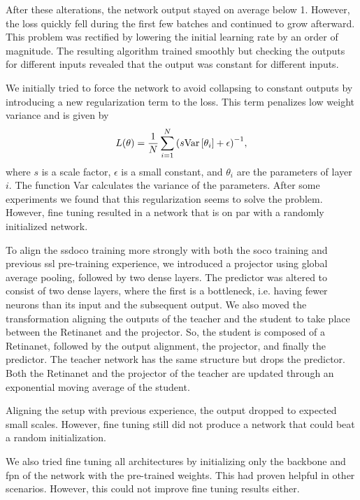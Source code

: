 After these alterations, the network output stayed on average below 1. However, the loss quickly fell during the first few batches and continued to grow afterward. This problem was rectified by lowering the initial learning rate by an order of magnitude. The resulting algorithm trained smoothly but checking the outputs for different inputs revealed that the output was constant for different inputs.

We initially tried to force the network to avoid collapsing to constant outputs by introducing a new regularization term to the loss. This term penalizes low weight variance and is given by
\begin{equation}
L{\left( \theta \right)}=\frac{1}{N}\sum_{i=1}^N{\left( s\text{Var}\left[\theta_i\right]+\epsilon \right)}^{-1},
\end{equation}
where $s$ is a scale factor, $\epsilon$ is a small constant, and $\theta_i$ are the parameters of layer $i$. The function Var calculates the variance of the parameters. After some experiments we found that this regularization seems to solve the problem. However, fine tuning resulted in a network that is on par with a randomly initialized network.

To align the \acrshort{ssdoco} training more strongly with both the \acrshort{soco} training and previous \acrshort{ssl} pre-training experience, we introduced a projector using global average pooling, followed by two dense layers. The predictor was altered to consist of two dense layers, where the first is a bottleneck, i.e. having fewer neurons than its input and the subsequent output. We also moved the transformation aligning the outputs of the teacher and the student to take place between the Retinanet and the projector. So, the student is composed of a Retinanet, followed by the output alignment, the projector, and finally the predictor. The teacher network has the same structure but drops the predictor. Both the Retinanet and the projector of the teacher are updated through an exponential moving average of the student.

Aligning the setup with previous experience, the output dropped to expected small scales. However, fine tuning still did not produce a network that could beat a random initialization.

We also tried fine tuning all architectures by initializing only the backbone and \acrshort{fpn} of the network with the pre-trained weights. This had proven helpful in other scenarios. However, this could not improve fine tuning results either.

